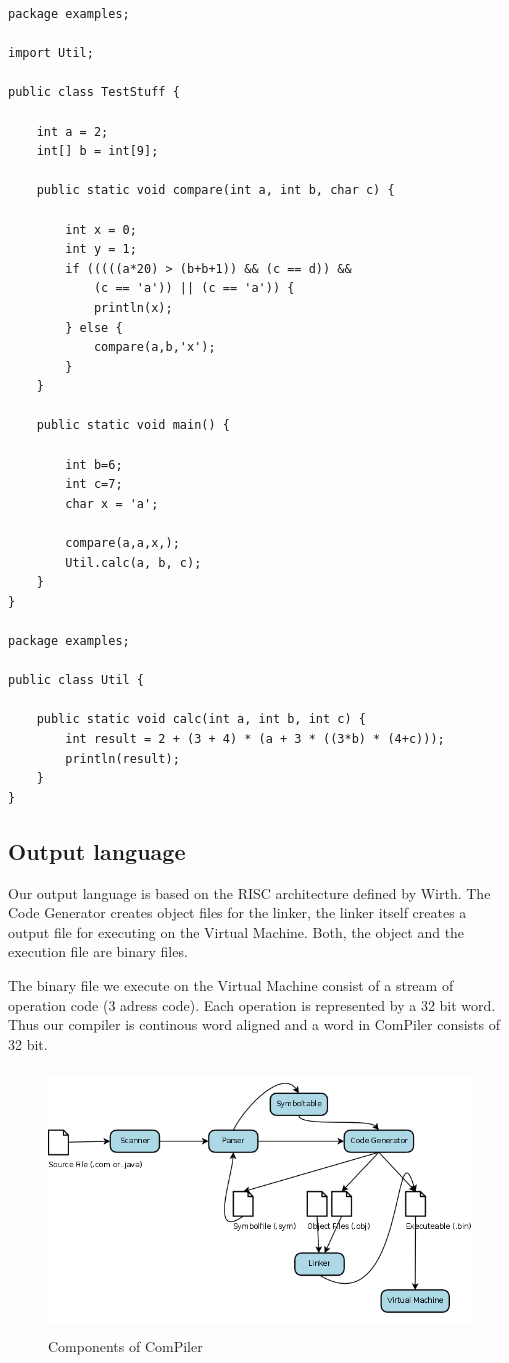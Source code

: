 \begin{lstlisting}[caption={Input language example},label={example}]
package examples;

import Util;

public class TestStuff {

	int a = 2;
	int[] b = int[9];
	
	public static void compare(int a, int b, char c) {

		int x = 0;
		int y = 1;
		if (((((a*20) > (b+b+1)) && (c == d)) && 
			(c == 'a')) || (c == 'a')) {
			println(x);
		} else {
			compare(a,b,'x');
		}
	}
	
	public static void main() {
		
		int b=6;
		int c=7;
		char x = 'a';

		compare(a,a,x,);
		Util.calc(a, b, c);
	}
}

package examples;

public class Util {
	
	public static void calc(int a, int b, int c) {
		int result = 2 + (3 + 4) * (a + 3 * ((3*b) * (4+c)));
		println(result);
	}
}
\end{lstlisting}

\subsection{Output language}
Our output language is based on the RISC architecture defined by Wirth. The Code Generator creates object files for the linker, the linker itself creates a output file for executing on the Virtual Machine. Both, the object and the execution file are binary files.

The binary file we execute on the Virtual Machine consist of a stream of operation code (3 adress code). Each operation is represented by a 32 bit word. Thus our compiler is continous word aligned and a word in ComPiler consists of 32 bit. 

\begin{figure}[h]
\label{components}
\begin{center}
\includegraphics[width=13cm,height=7cm]{images/compParts.png}
\end{center}
\caption{Components of ComPiler}
\end{figure}


